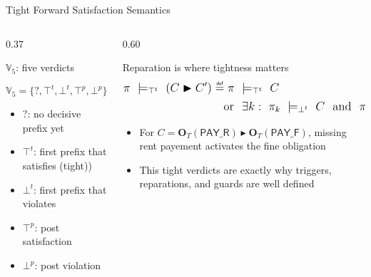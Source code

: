 \documentclass[9pt,aspectratio=169]{beamer}
\newcommand{\repair}{\ensuremath{\blacktriangleright}}
\newcommand{\obl}[2][]{\mathbf{O}_{#1}(#2)}
\newcommand{\nd}{\text{ and }}
\newcommand{\sor}{\text{ or }}
\newcommand{\topt}{\top^t}
\newcommand{\bott}{\bot^t}
\newcommand{\topp}{\top^p}
\newcommand{\botp}{\bot^p}
\newcommand{\satt}{\models_{\topt}}
\newcommand{\violt}{\models_{\bott}}
\newcommand{\PAY}{\ensuremath{\mathsf{PAY\_R}}\xspace}
\newcommand{\PAYF}{\ensuremath{\mathsf{PAY\_F}}\xspace}
\newcommand{\mydef}{\mathrel{\overset{\makebox[0pt]{\mbox{\normalfont\tiny\sffamily def}}}{=}}}
\begin{document}
\begin{frame}{Tight Forward Satisfaction Semantics}
\begin{columns}[T,totalwidth=\textwidth]
\begin{column}{0.37\textwidth}
  \begin{block}{$\mathbb{V}_5$: five verdicts}
 
    \[
    \mathbb{V}_5=\{?,\topt,\bott,\topp,\botp\}
    \]
    \vspace{-2mm}
    \begin{itemize}\setlength\itemsep{2pt}
      \item $?$: no decisive prefix yet
      \item $\topt$: first prefix that satisfies (tight))
      \item $\bott$: first prefix that violates
      \item $\topp$: post satisfaction
      \item $\botp$: post violation
    \end{itemize}
  \end{block}
\end{column}

\begin{column}{0.60\textwidth}
  \begin{block}{Reparation is where tightness matters}
    \[\large
    \begin{aligned}
    \pi\ \satt\ (C\repair C')
      &\mydef \pi\ \satt\ C\ \\ &~~\sor\ \exists k:\ \pi_k\ \violt\ C\ \nd\ \pi^k\ \satt\ C'\\
    \end{aligned}
    \]
    \begin{itemize}\setlength\itemsep{2pt}
      \item For $C=\obl[T]{\PAY}\repair\obl[T]{\PAYF}$, missing rent payement activates the fine obligation
      \item This tight verdicts are exactly why triggers, reparations, and guards are well defined
    \end{itemize}
  \end{block}
\end{column}
\end{columns}
\end{frame}
\end{document}
